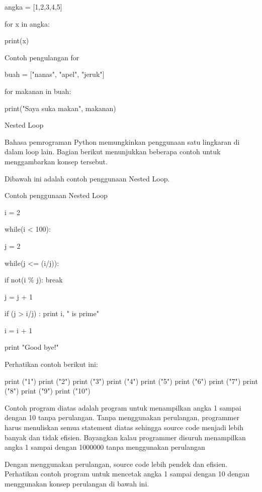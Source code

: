 angka = [1,2,3,4,5] 
 

for x in angka: 
 

        print(x) 
 


Contoh pengulangan for 
 

buah = ["nanas", "apel", "jeruk"] 
 

for makanan in buah: 
 

        print("Saya suka makan", makanan) 
 



 
Nested Loop 

 
Bahasa pemrograman Python memungkinkan penggunaan satu lingkaran di dalam loop lain. Bagian berikut menunjukkan beberapa contoh untuk menggambarkan konsep tersebut.   

Dibawah ini adalah contoh penggunaan Nested Loop. 
 
Contoh penggunaan Nested Loop 
 


i = 2 
 

while(i < 100): 
 

        j = 2 
 

        while(j <= (i/j)): 
 

                if not(i   \%  j): break 
 

                j = j + 1 
 

        if (j > i/j) : print i, " is prime" 
 

        i = i + 1 
 


print "Good bye!" 


Perhatikan contoh berikut ini:

 

print ("1") 
print ("2") 
print ("3") 
print ("4") 
print ("5") 
print ("6") 
print ("7") 
print ("8") 
print ("9") 
print ("10") 


Contoh program diatas adalah program untuk menampilkan angka 1 sampai dengan 10 tanpa perulangan. Tanpa menggunakan perulangan, programmer harus menuliskan semua statement diatas sehingga source code menjadi lebih banyak dan tidak efisien. Bayangkan kalau programmer disuruh menampilkan angka 1 sampai dengan 1000000 tanpa menggunakan perulangan

Dengan menggunakan perulangan, source code lebih pendek dan efisien. Perhatikan contoh program untuk mencetak angka 1 sampai dengan 10 dengan menggunakan konsep perulangan di bawah ini.

